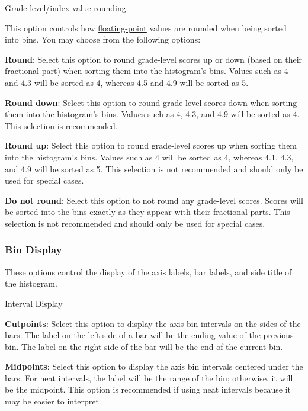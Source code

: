 \documentclass[
]{book}
\newenvironment{optionssection}
    {
    \begin{tcolorbox}[colframe=lightgray,colback=ultralightgray,sharp corners=all,parbox=false]
    }
    {
    \end{tcolorbox}
    }
\newenvironment{optionssectiontitle}
    {
    \begin{tcolorbox}[colframe=lightgray,colback=lightgray]
    \bfseries
    }
    {
    \end{tcolorbox}
    }
\theoremstyle{definition}
\theoremstyle{definition}
\theoremstyle{definition}
\theoremstyle{definition}
\theoremstyle{remark}
\begin{document}
\begin{optionssection}

\begin{optionssectiontitle}
Grade level/index value rounding

\end{optionssectiontitle}

This option controls how \protect\hyperlink{grade-level-results}{floating-point} values are rounded when being sorted into bins. You may choose from the following options:

\textbf{Round}: Select this option to round grade-level scores up or down (based on their fractional part) when sorting them into the histogram's bins. Values such as 4 and 4.3 will be sorted as 4, whereas 4.5 and 4.9 will be sorted as 5.

\textbf{Round down}: Select this option to round grade-level scores down when sorting them into the histogram's bins. Values such as 4, 4.3, and 4.9 will be sorted as 4. This selection is recommended.

\textbf{Round up}: Select this option to round grade-level scores up when sorting them into the histogram's bins. Values such as 4 will be sorted as 4, whereas 4.1, 4.3, and 4.9 will be sorted as 5. This selection is not recommended and should only be used for special cases.

\textbf{Do not round}: Select this option to not round any grade-level scores. Scores will be sorted into the bins exactly as they appear with their fractional parts. This selection is not recommended and should only be used for special cases.

\end{optionssection}

\hypertarget{bin-display}{%
\subsubsection*{Bin Display}\label{bin-display}}

These options control the display of the axis labels, bar labels, and side title of the histogram.

\begin{optionssection}

\begin{optionssectiontitle}
Interval Display

\end{optionssectiontitle}

\textbf{Cutpoints}: Select this option to display the axis bin intervals on the sides of the bars. The label on the left side of a bar will be the ending value of the previous bin. The label on the right side of the bar will be the end of the current bin.

\textbf{Midpoints}: Select this option to display the axis bin intervals centered under the bars. For neat intervals, the label will be the range of the bin; otherwise, it will be the midpoint. This option is recommended if using neat intervals because it may be easier to interpret.

\end{optionssection}
\end{document}
